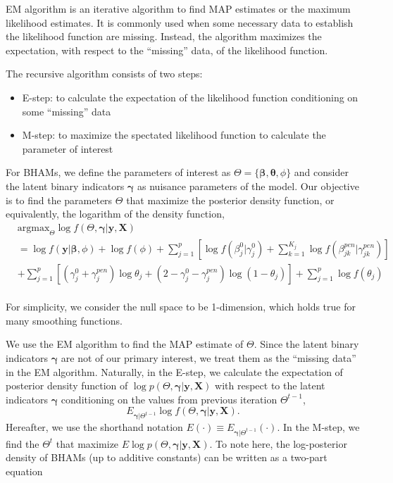 \documentclass[AMA,STIX1COL,]{WileyNJD-v2}
\providecommand{\tightlist}{%
  \setlength{\itemsep}{0pt}\setlength{\parskip}{0pt}}
\begin{document}
EM algorithm is an iterative algorithm to find MAP estimates or the
maximum likelihood estimates. It is commonly used when some necessary
data to establish the likelihood function are missing. Instead, the
algorithm maximizes the expectation, with respect to the ``missing''
data, of the likelihood function.

The recursive algorithm consists of two steps:

\begin{itemize}
\tightlist
\item
  E-step: to calculate the expectation of the likelihood function
  conditioning on some ``missing'' data
\item
  M-step: to maximize the spectated likelihood function to calculate the
  parameter of interest
\end{itemize}

For BHAMs, we define the parameters of interest as
\(\Theta = \{\boldsymbol{\beta}, \boldsymbol{\theta}, \phi\}\) and
consider the latent binary indicators \(\boldsymbol{\gamma}\) as
nuisance parameters of the model. Our objective is to find the
parameters \(\Theta\) that maximize the posterior density function, or
equivalently, the logarithm of the density function, \[
\begin{aligned}
& \text{argmax}_{\Theta}
\log f(\Theta, \boldsymbol{\gamma}| \textbf{y}, \textbf{X}) \\
&= \log f(\textbf{y}|\boldsymbol{\beta}, \phi) + \log f(\phi) + \sum\limits_{j=1}^p\left[\log f(\beta^0_j|\gamma^0_j)+\sum\limits_{k=1}^{K_j} \log f(\beta^{pen}_{jk}|\gamma^{pen}_{jk})\right]\\
& +\sum\limits_{j=1}^{p} \left[ (\gamma^0_j+\gamma_{j}^{pen})\log \theta_j + (2-\gamma^0_j-\gamma_{j}^{pen}) \log (1-\theta_j)\right] +  \sum\limits_{j=1}^{p}\log f(\theta_j)
\end{aligned}
\]\\
For simplicity, we consider the null space to be 1-dimension, which
holds true for many smoothing functions.

We use the EM algorithm to find the MAP estimate of \(\Theta\). Since
the latent binary indicators \(\boldsymbol{\gamma}\) are not of our
primary interest, we treat them as the ``missing data'' in the EM
algorithm. Naturally, in the E-step, we calculate the expectation of
posterior density function of
\(\log p(\Theta, \boldsymbol{\gamma}| \textbf{y}, \textbf{X})\) with
respect to the latent indicators \(\boldsymbol{\gamma}\) conditioning on
the values from previous iteration \(\Theta^{t-1}\), \[
E_{\boldsymbol{\gamma}|\Theta^{t-1}}\log f(\Theta, \boldsymbol{\gamma}| \textbf{y}, \textbf{X}) .
\] Hereafter, we use the shorthand notation
\(E(\cdot)\equiv E_{\boldsymbol{\gamma}|\Theta^{t-1}}(\cdot)\). In the
M-step, we find the \(\Theta^{t}\) that maximize
\(E\log p(\Theta, \boldsymbol{\gamma}| \textbf{y}, \textbf{X})\). To
note here, the log-posterior density of BHAMs (up to additive constants)
can be written as a two-part equation
\end{document}
